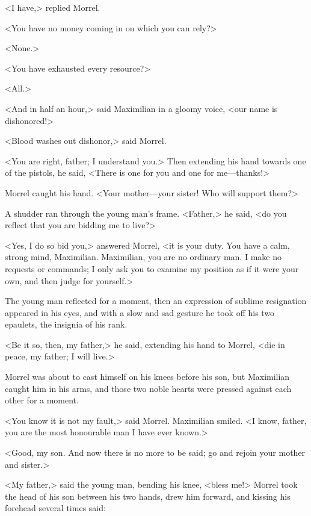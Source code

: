  <I have,> replied Morrel. 

 <You have no money coming in on which you can rely?> 

 <None.> 

 <You have exhausted every resource?> 

 <All.> 

 <And in half an hour,> said Maximilian in a gloomy voice, <our name is dishonored!> 

 <Blood washes out dishonor,> said Morrel. 

 <You are right, father; I understand you.> Then extending his hand towards one of the pistols, he said, <There is one for you and one for me—thanks!> 

 Morrel caught his hand. <Your mother—your sister! Who will support them?> 

 A shudder ran through the young man's frame. <Father,> he said, <do you reflect that you are bidding me to live?> 

 <Yes, I do so bid you,> answered Morrel, <it is your duty. You have a calm, strong mind, Maximilian. Maximilian, you are no ordinary man. I make no requests or commands; I only ask you to examine my position as if it were your own, and then judge for yourself.> 

 The young man reflected for a moment, then an expression of sublime resignation appeared in his eyes, and with a slow and sad gesture he took off his two epaulets, the insignia of his rank. 

 <Be it so, then, my father,> he said, extending his hand to Morrel, <die in peace, my father; I will live.> 

 Morrel was about to cast himself on his knees before his son, but Maximilian caught him in his arms, and those two noble hearts were pressed against each other for a moment. 

 <You know it is not my fault,> said Morrel.  Maximilian smiled. <I know, father, you are the most honourable man I have ever known.> 

 <Good, my son. And now there is no more to be said; go and rejoin your mother and sister.> 

 <My father,> said the young man, bending his knee, <bless me!> Morrel took the head of his son between his two hands, drew him forward, and kissing his forehead several times said: 

